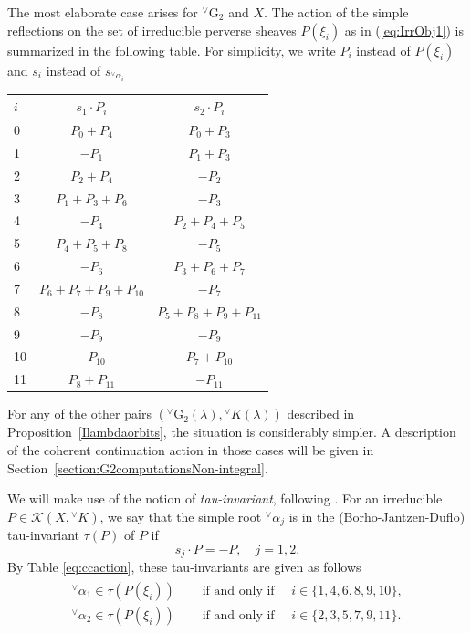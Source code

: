\documentclass[a4paper, 11pt]{article}
\begin{document}
The most elaborate case arises for
${}^{\vee}\mathrm{G}_2$ and $X$.  
The action of the simple reflections on the set of irreducible
perverse sheaves  $P(\xi_i)$ as in (\ref{eq:IrrObj1})
is summarized in the  following  table. For simplicity, we write
$P_i$ instead of $P(\xi_i)$ and $s_{i}$ instead of $s_{{^\vee}\alpha_{i}}$

\begin{minipage}{\linewidth}
\bigskip
\centering
{}
\label{eq:ccaction} 
\begin{tabular}{ | l | c | c | }
\hline 
 $i$ & $s_{1}\cdot P_i$ & $s_{2}\cdot P_i$
\\ \hline \hline
		
   0 & $P_0+P_4$ & $P_0+P_3$\\	\hline
   1 & $-P_1$ & $P_1+P_3$ \\ \hline
   2 & $P_2+P_4$ & $-P_2$ \\ \hline
   3 & $P_1+P_3+P_6$ & $-P_3$  \\ \hline
   4 & $-P_4$ & $P_2+P_4+P_5$\\ \hline
   5 & $P_4+P_5+P_8$ & $-P_5$\\ \hline
   6 & $-P_6$ & $P_3+P_6+P_7$\\ \hline
   7 & $P_6+P_7+P_9+P_{10}$ & $-P_7$\\ \hline
   8 & $-P_8$ & $P_5+P_8+P_9+P_{11}$\\ \hline
   9 & $-P_9$ & $-P_9$\\ \hline
   10 & $-P_{10}$ & $P_7+P_{10}$\\ \hline
   11 & $P_8+P_{11}$ & $-P_{11}$ \\ 
 \hline  
\end{tabular}
 
 
\bigskip 
  \end{minipage}
For any of the other pairs
$\left({}^{\vee}\mathrm{G}_{2}(\lambda),{}^{\vee}K(\lambda) \right)$
described in Proposition~\ref{Ilambdaorbits}, the situation is considerably
simpler. A description of the coherent continuation action in those
cases will be given in Section~\ref{section:G2computationsNon-integral}. 

We will make use of the notion of \emph{tau-invariant}, following
\cite[{Definition 7.3.8}]{greenbook}.  For an irreducible
$P\in \mathscr{K}(X, {^\vee}K)$, we say that the simple root
${^\vee}\alpha_{j}$ is in the (Borho-Jantzen-Duflo) tau-invariant
$\tau(P)$ of $P$ if 
\begin{equation}\label{eq:verticalP}
s_{j} \cdot P=-P, \quad j = 1,2.
\end{equation}
By Table \ref{eq:ccaction}, these tau-invariants are given as follows 
\begin{align}
\begin{aligned}\label{eq:tau}
{^\vee}\alpha_1\in \tau(P(\xi_i))&\quad\text{ if and only if }\quad
i\in\{1,4,6,8,9,10\},\\ 
{^\vee}\alpha_2\in \tau(P(\xi_i))&\quad\text{ if and only if }\quad
i\in\{2,3,5,7,9,11\}. 
\end{aligned}
\end{align}
\end{document}
